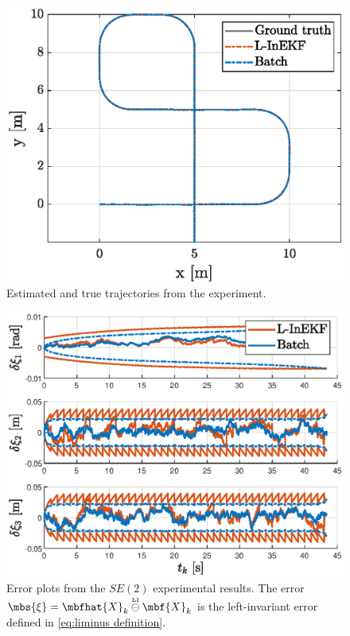 \documentclass[ nobib, nofonts, notoc]{tufte-handout}
\newcommand{\liminus}{\overset{{\scriptscriptstyle\mathrm{LI}}}{\ominus}}
\begin{document}
    \begin{figure}[ht]
      \centering
      \includegraphics[width=\textwidth]{figs/se2_example_trajectories.eps}
      \caption{Estimated and true trajectories from the experiment.}
      \label{fig:se2_example_trajectories.eps}
    \end{figure}
    
    \begin{figure}[ht]
      \centering
      \includegraphics[width=\textwidth]{figs/se2_example_error_plots.eps}
      \caption{
          Error plots from the $SE(2)$ experimental results.
          The error $\mbs{\xi} = \mbfhat{X}_{k}\liminus \mbf{X}_{k}$ is the left-invariant error defined in \eqref{eq:liminus definition}.
        }
      \label{fig:se2_example_error_plots.eps}
    \end{figure}
    
    \clearpage
    
    
\end{document}
